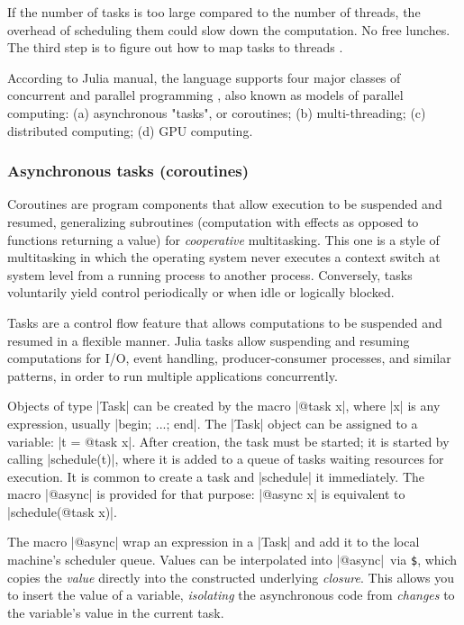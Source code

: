 If the number of tasks is too large compared to the number of threads, the overhead of scheduling them could slow down the computation. No free lunches.
The third step is to figure out how to map tasks to threads \cite{Aubanel:2016}. 

According to Julia manual, the language supports four major classes of concurrent and parallel programming \cite{julia:ParallelComputing}, also known as models of parallel computing: (a) asynchronous "tasks", or coroutines; (b) multi-threading; (c) distributed computing; (d) GPU computing.
 

\subsubsection*{Asynchronous tasks (coroutines)}
Coroutines are program components that allow execution to be suspended and resumed, generalizing subroutines (computation with effects as opposed to functions returning a value) for \emph{cooperative} multitasking. This one is a style of  multitasking in which the operating system never executes a context switch at system level from a running process to another process. Conversely, tasks voluntarily yield control periodically or when idle or logically blocked.

Tasks are a control flow feature that allows computations to be suspended and resumed in a flexible manner.  Julia tasks allow suspending and resuming computations for I/O, event handling, producer-consumer processes, and similar patterns,  in order to run multiple applications concurrently.

Objects of type |Task| can be created by the macro |@task x|, where |x| is any expression, usually |begin; ...; end|. The |Task| object can be assigned to a variable: |t = @task x|. After creation, the task must be started; it is started by calling |schedule(t)|, where it is added to a queue of tasks waiting resources for execution. It is common to create a task and |schedule| it immediately. The macro |@async| is provided for that purpose: |@async x| is equivalent to |schedule(@task x)|.


The macro |@async| wrap an expression in a |Task| and add it to the local machine's scheduler queue.
Values can be interpolated into |@async|\ via \texttt{\$}, which copies the \emph{value} directly into the constructed underlying \emph{closure}. This allows you to insert the value of a variable, \emph{isolating} the asynchronous code from \emph{changes} to the variable's value in the current task.


